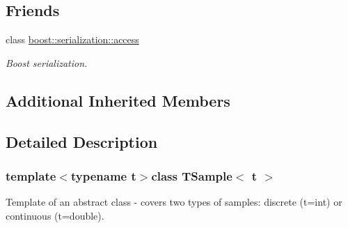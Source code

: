 \subsection*{Friends}
\begin{DoxyCompactItemize}
\item 
class \hyperlink{class_t_sample_ac98d07dd8f7b70e16ccb9a01abf56b9c}{boost\-::serialization\-::access}
\begin{DoxyCompactList}\small\item\em Boost serialization. \end{DoxyCompactList}\end{DoxyCompactItemize}
\subsection*{Additional Inherited Members}


\subsection{Detailed Description}
\subsubsection*{template$<$typename t$>$class T\-Sample$<$ t $>$}

Template of an abstract class -\/ covers two types of samples\-: discrete (t=int) or continuous (t=double). 

